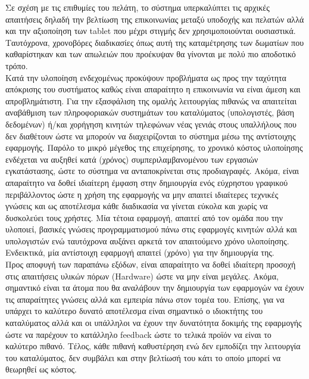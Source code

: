 \noindent
Σε σχέση με τις επιθυμίες του πελάτη, το σύστημα υπερκαλύπτει τις αρχικές απαιτήσεις δηλαδή την 
βελτίωση της επικοινωνίας μεταξύ υποδοχής και πελατών αλλά και την αξιοποίηση των tablet που μέχρι 
στιγμής δεν χρησιμοποιούνται ουσιαστικά. Ταυτόχρονα, χρονοβόρες διαδικασίες όπως αυτή της 
καταμέτρησης των δωματίων που καθαρίστηκαν και των απωλειών που προέκυψαν θα γίνονται με πολύ πιο 
αποδοτικό τρόπο. \\

\noindent
Κατά την υλοποίηση ενδεχομένως προκύψουν προβλήματα ως προς την ταχύτητα απόκρισης του συστήματος 
καθώς είναι απαραίτητο η επικοινωνία να είναι άμεση και απροβλημάτιστη. Για την εξασφάλιση της ομαλής 
λειτουργίας πιθανώς να απαιτείται αναβάθμιση των πληροφοριακών συστημάτων του καταλύματος 
(υπολογιστές, βάση δεδομένων) ή/και χορήγηση κινητών τηλεφώνων νέας γενιάς στους υπαλλήλους που δεν 
διαθέτουν ώστε  να μπορούν να διαχειρίζονται το σύστημα μέσω της αντίστοιχης εφαρμογής. Παρόλο το 
μικρό μέγεθος της επιχείρησης, το χρονικό κόστος υλοποίησης ενδέχεται να αυξηθεί κατά (χρόνος) 
συμπεριλαμβανομένου των εργασιών εγκατάστασης, ώστε το σύστημα να ανταποκρίνεται στις προδιαγραφές.
Ακόμα, είναι απαραίτητο να δοθεί ιδιαίτερη έμφαση στην δημιουργία ενός εύχρηστου γραφικού 
περιβάλλοντος ώστε η χρήση της εφαρμογής να μην απαιτεί ιδιαίτερες τεχνικές γνώσεις και ως αποτέλεσμα 
κάθε διαδικασία να γίνεται εύκολα και χωρίς να δυσκολεύει τους χρήστες. Μία τέτοια εφαρμογή, απαιτεί 
από τον ομάδα που την υλοποιεί, βασικές γνώσεις προγραμματισμού πάνω στις εφαρμογές κινητών αλλά και 
υπολογιστών ενώ ταυτόχρονα αυξάνει αρκετά τον απαιτούμενο χρόνο υλοποίησης. Ενδεικτικά, μία 
αντίστοιχη εφαρμογή  απαιτεί (χρόνο) για την δημιουργία της.\\ 

\noindent
Προς αποφυγή των παραπάνω εξόδων, είναι απαραίτητο να δοθεί ιδιαίτερη προσοχή στις απαιτήσεις υλικών 
πόρων (Hardware) ώστε να μην είναι μεγάλες. Ακόμα, σημαντικό είναι τα άτομα που θα αναλάβουν την 
δημιουργία των εφαρμογών να έχουν τις απαραίτητες γνώσεις αλλά και εμπειρία πάνω στον τομέα του. 
Επίσης, για να υπάρχει το καλύτερο δυνατό αποτέλεσμα είναι σημαντικό ο ιδιοκτήτης του καταλύματος 
αλλά και οι υπάλληλοι να έχουν την δυνατότητα δοκιμής της εφαρμογής ώστε να παρέχουν το κατάλληλο 
feedback ώστε το τελικά προϊόν να είναι το καλύτερο πιθανό. Τέλος, κάθε πιθανή καθυστέρηση ενώ δεν 
εμποδίζει την λειτουργία του καταλύματος, δεν συμβάλει και στην βελτίωσή του κάτι το οποίο μπορεί να 
θεωρηθεί ως κόστος.
		
		
		    